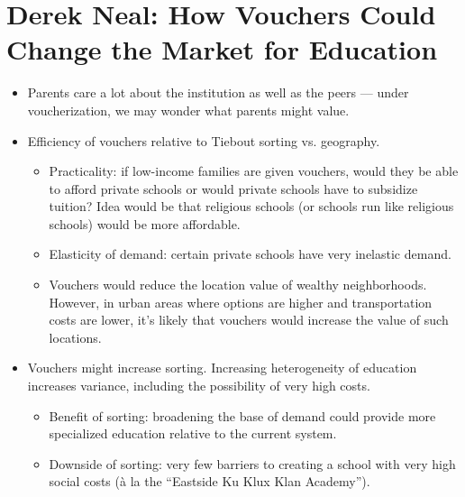 \documentclass[10pt]{extarticle}
\begin{document}
  \section{Derek Neal: How Vouchers Could Change the Market for Education}%
  \begin{itemize}
    \item Parents care a lot about the institution as well as the peers --- under voucherization, we may wonder what parents might value. 
    \item Efficiency of vouchers relative to Tiebout sorting vs. geography.
      \begin{itemize}
        \item Practicality: if low-income families are given vouchers, would they be able to afford private schools or would private schools have to subsidize tuition? Idea would be that religious schools (or schools run like religious schools) would be more affordable.
        \item Elasticity of demand: certain private schools have very inelastic demand.
        \item Vouchers would reduce the location value of wealthy neighborhoods. However, in urban areas where options are higher and transportation costs are lower, it's likely that vouchers would increase the value of such locations.
      \end{itemize}
    \item Vouchers might increase sorting. Increasing heterogeneity of education increases variance, including the possibility of very high costs.
      \begin{itemize}
        \item Benefit of sorting: broadening the base of demand could provide more specialized education relative to the current system.
        \item Downside of sorting: very few barriers to creating a school with very high social costs (à la the ``Eastside Ku Klux Klan Academy''). 
      \end{itemize}
  \end{itemize}
\end{document}
